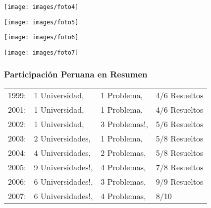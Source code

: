 \documentclass{beamer}
\begin{document}
\begin{frame}
 \begin{center}
 \texttt{[image: images/foto4]}
 \end{center}
\end{frame}

\begin{frame}
 \begin{center}
 \texttt{[image: images/foto5]}
 \end{center}
\end{frame}

\begin{frame}
 \begin{center}
 \texttt{[image: images/foto6]}
 \end{center}
\end{frame}

\begin{frame}
 \begin{center}
 \texttt{[image: images/foto7]}
 \end{center}
\end{frame}

\begin{frame}
 \frametitle{Participación Peruana en Resumen}
 \begin{tabular}{llll}
  1999:& 1 Universidad,& 1 Problema,& 4/6 Resueltos\\
2001:& 1 Universidad,& 1 Problema,& 4/6 Resueltos\\
2002:& 1 Universidad,& 3 Problemas!,& 5/6 Resueltos\\
2003:& 2 Universidades,& 1 Problema,& 5/8 Resueltos\\
2004:& 4 Universidades,& 2 Problemas,& 5/8 Resueltos\\
2005:& 9 Universidades!,& 4 Problemas,& 7/8 Resueltos\\
2006:& 6 Universidades!,& 3 Problemas,& 9/9 Resueltos\\
2007:& 6 Universidades!,& 4 Problemas,& 8/10\\
 \end{tabular}

\end{frame}
\end{document}
